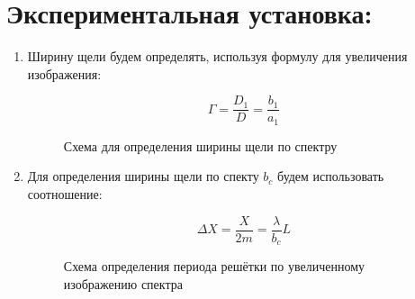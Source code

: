 \documentclass[12pt]{article}
\begin{document}
\section*{Экспериментальная установка:}
\begin{enumerate}
    
\begin{figure}[h!]
    \noindent{}
    \caption{Схема для определения ширины щели с помощью линзы}
\end{figure}

\item Ширину щели будем определять, используя формулу для увеличения изображения:

\begin{equation}
\label{1}
    \Gamma = \frac{D_1}{D} = \frac{b_1}{a_1}
\end{equation}  

\begin{figure}[h!]
    \noindent{}
    \caption{Схема для определения ширины щели по спектру}
\end{figure}

\item  Для определения ширины щели по спекту $b_c$ будем использовать соотношение:

\begin{equation}
\label{2}
    \Delta X = \frac{X}{2m} = \frac{\lambda}{b_c}L
\end{equation}  

\begin{figure}[h!]
    \noindent{}
    \caption{Схема определения периода решётки по
увеличенному изображению спектра}
\end{figure}


\end{enumerate}
\end{document}

